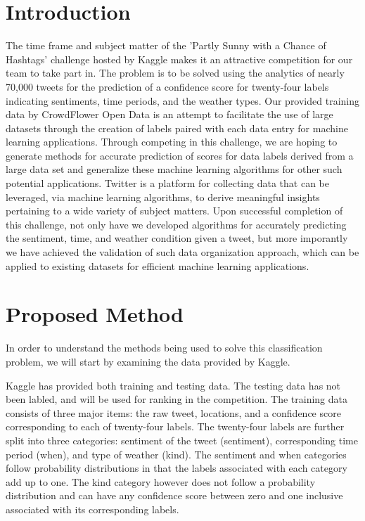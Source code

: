 \documentclass{article}
\begin{document}
\section{Introduction}
The time frame and subject matter of the 'Partly Sunny with a Chance of Hashtags' challenge hosted by Kaggle makes it an attractive competition for our team to take part in. The problem is to be solved using the analytics of nearly 70,000 tweets for the prediction of a confidence score for twenty-four labels indicating sentiments, time periods, and the weather types. Our provided training data by CrowdFlower Open Data is an attempt to facilitate the use of large datasets through the creation of labels paired with each data entry for machine learning applications. Through competing in this challenge, we are hoping to generate methods for accurate prediction of scores for data labels derived from a large data set and generalize these machine learning algorithms for other such potential applications. Twitter is a platform for collecting data that can be leveraged, via machine learning algorithms, to derive meaningful insights pertaining to a wide variety of subject matters. Upon successful completion of this challenge, not only have we developed algorithms for accurately predicting the sentiment, time, and weather condition given a tweet, but more imporantly we have achieved the validation of such data organization approach, which can be applied to existing datasets for efficient machine learning applications.

\section{Proposed Method}
In order to understand the methods being used to solve this classification problem, we will start by examining the data provided by Kaggle.

Kaggle has provided both training and testing data. The testing data has not been labled, and will be used for ranking in the competition. The training data consists of three major items: the raw tweet, locations, and a confidence score corresponding to each of twenty-four labels. The twenty-four labels are further split into three categories: sentiment of the tweet (sentiment), corresponding time period (when), and type of weather (kind). The sentiment and when categories follow probability distributions in that the labels associated with each category add up to one. The kind category however does not follow a probability distribution and can have any confidence score between zero and one inclusive associated with its corresponding labels.
\end{document}

